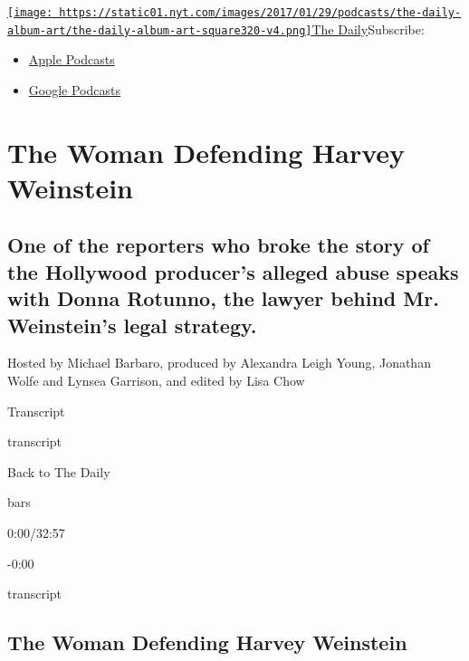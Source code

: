\href{https://www.nytimes.com/column/the-daily}{\texttt{[image: https://static01.nyt.com/images/2017/01/29/podcasts/the-daily-album-art/the-daily-album-art-square320-v4.png]}The
Daily}Subscribe:

\begin{itemize}
\tightlist
\item
  \href{https://itunes.apple.com/us/podcast/id1200361736}{Apple
  Podcasts}
\item
  \href{https://www.google.com/podcasts?feed=aHR0cHM6Ly9yc3MuYXJ0MTkuY29tL3RoZS1kYWlseQ\%3D\%3D}{Google
  Podcasts}
\end{itemize}

\hypertarget{the-woman-defending-harvey-weinstein-1}{%
\section{The Woman Defending Harvey
Weinstein}\label{the-woman-defending-harvey-weinstein-1}}

\hypertarget{one-of-the-reporters-who-broke-the-story-of-the-hollywood-producers-alleged-abuse-speaks-with-donna-rotunno-the-lawyer-behind-mr-weinsteins-legal-strategy-1}{%
\subsection{One of the reporters who broke the story of the Hollywood
producer's alleged abuse speaks with Donna Rotunno, the lawyer behind
Mr. Weinstein's legal
strategy.}\label{one-of-the-reporters-who-broke-the-story-of-the-hollywood-producers-alleged-abuse-speaks-with-donna-rotunno-the-lawyer-behind-mr-weinsteins-legal-strategy-1}}

Hosted by Michael Barbaro, produced by Alexandra Leigh Young, Jonathan
Wolfe and Lynsea Garrison, and edited by Lisa Chow

Transcript

transcript

Back to The Daily

bars

0:00/32:57

-0:00

transcript

\hypertarget{the-woman-defending-harvey-weinstein-2}{%
\subsection{The Woman Defending Harvey
Weinstein}\label{the-woman-defending-harvey-weinstein-2}}

